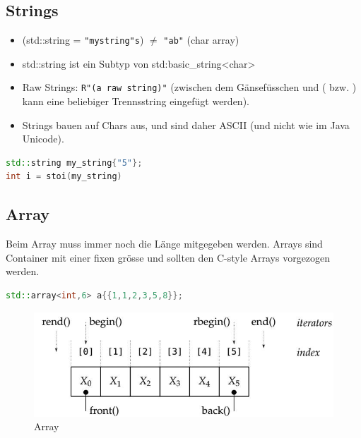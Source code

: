 \subsection{Strings}
\begin{itemize}
	\item (std::string = \lstinline|"mystring"s|) $\neq$ \lstinline|"ab"| (char array)
	\item std::string ist ein Subtyp von std:basic\_string<char>
	\item Raw Strings: \lstinline|R"(a raw string)"| (zwischen dem Gänsefüsschen und ( bzw. ) kann eine beliebiger Trennsstring eingefügt werden).
	\item Strings bauen auf Chars aus, und sind daher ASCII (und nicht wie im Java Unicode).
\end{itemize}
\begin{lstlisting}[language=C++]
std::string my_string{"5"};
int i = stoi(my_string)
\end{lstlisting}

\subsection{Array}
Beim Array muss immer noch die Länge mitgegeben werden. Arrays sind Container mit einer fixen grösse und sollten den C-style Arrays vorgezogen werden.
\begin{lstlisting}[language=C++]
std::array<int,6> a{{1,1,2,3,5,8}};
\end{lstlisting}

\begin{figure}[h]
\centering
\includegraphics[width=0.7\linewidth]{images/array}
\caption{Array}
\label{fig:array}
\end{figure}
	

